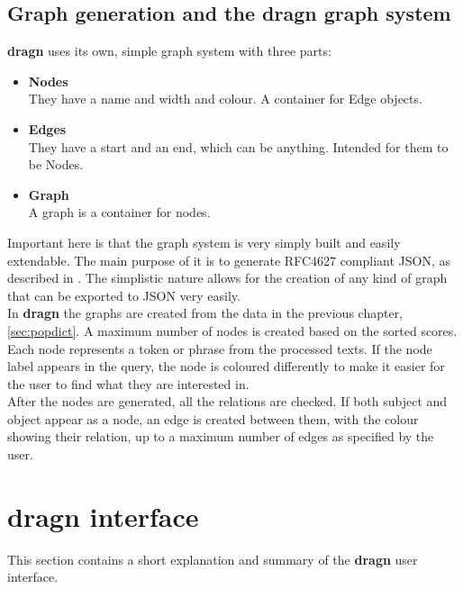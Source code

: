 \subsection{Graph generation and the dragn graph system}
\textbf{dragn} uses its own, simple graph system with three parts:
\begin{itemize}
\item \textbf{Nodes}\\
    They have a name and width and colour. A container for Edge objects.
\item \textbf{Edges}\\
    They have a start and an end, which can be anything. Intended for them to be Nodes. 
\item \textbf{Graph}\\
    A graph is a container for nodes.
\end{itemize}
Important here is that the graph system is very simply built and easily extendable. The main purpose of it is to generate RFC4627 compliant JSON, as described in \cite{crockford2006application}. The simplistic nature allows for the creation of any kind of graph that can be exported to JSON very easily.\\
In \textbf{dragn} the graphs are created from the data in the previous chapter, \ref{sec:popdict}. A maximum number of nodes is created based on the sorted scores. Each node represents a token or phrase from the processed texts. If the node label appears in the query, the node is coloured differently to make it easier for the user to find what they are interested in.\\
After the nodes are generated, all the relations are checked. If both subject and object appear as a node, an edge is created between them, with the colour showing their relation, up to a maximum number of edges as specified by the user.


\section{dragn interface}
This section contains a short explanation and summary of the \textbf{dragn} user interface.

